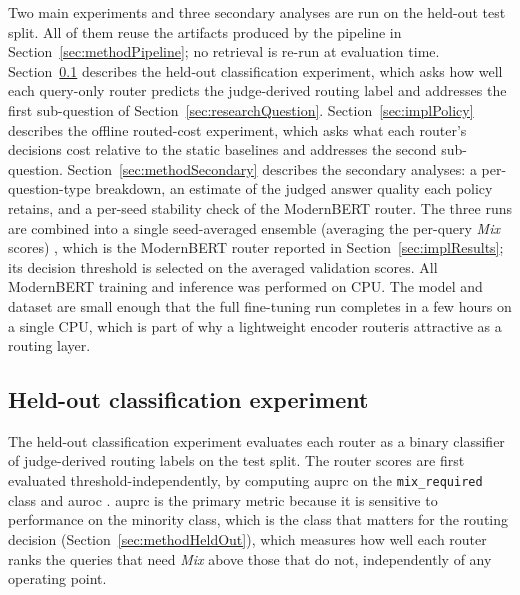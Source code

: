 \documentclass[english, bibtex]{kththesis}               %
\numberwithin{listing}{chapter}
\providecommand{\DIFaddtex}[1]{{\protect\color{blue} \sf #1}} %
\providecommand{\DIFdeltex}[1]{{\protect\color{red} \scriptsize #1}} %
\providecommand{\DIFaddbegin}{} %
\providecommand{\DIFaddend}{} %
\providecommand{\DIFdelbegin}{} %
\providecommand{\DIFdelend}{} %
\providecommand{\DIFadd}[1]{\texorpdfstring{\DIFaddtex{#1}}{#1}} %
\providecommand{\DIFdel}[1]{\texorpdfstring{\DIFdeltex{#1}}{}} %
\begin{document}
\DIFadd{Two main experiments and three secondary analyses are run on the held-out test split. All of them reuse the artifacts produced by the pipeline in Section~\ref{sec:methodPipeline}; no retrieval is re-run at evaluation time. Section~\ref{sec:implClassification} describes the held-out classification experiment, which asks how well each query-only router predicts the judge-derived routing label and addresses the first sub-question of Section~\ref{sec:researchQuestion}. Section~\ref{sec:implPolicy} describes the offline routed-cost experiment, which asks what each router's decisions cost relative to the static baselines and addresses the second sub-question. Section~\ref{sec:methodSecondary} describes the secondary analyses: a per-question-type breakdown, an estimate of the judged answer quality each policy retains, and a per-seed stability check of the ModernBERT router}\DIFaddend .
\DIFdelbegin \DIFdel{The three runs are combined into a single seed-averaged ensemble (averaging the per-query \emph{Mix} scores) , which is the ModernBERT router reported in Section~\ref{sec:implResults}; its decision threshold is selected on the averaged validation scores. All ModernBERT training and inference was performed on CPU. The model and dataset are small enough that the full fine-tuning run completes in a few hours on a single CPU, which is part of why a lightweight encoder routeris attractive as a routing layer.
}\DIFdelend 

\DIFdelbegin %
\DIFdelend \DIFaddbegin \subsection{Held-out classification experiment}
\DIFaddend \label{sec:implClassification}

The held-out classification experiment evaluates each router as a binary classifier of judge-derived routing labels on the test split. The router scores are first evaluated threshold-independently, by computing \gls{auprc} on the \texttt{mix\_required} class and \gls{auroc} \DIFdelbegin \DIFdel{. \Gls{auprc} is the primary metric because it is sensitive to performance on the minority class, which is the class that matters for the routing decision \cite{saito2015precision}}\DIFdelend \DIFaddbegin \DIFadd{(Section~\ref{sec:methodHeldOut}), which measures how well each router ranks the queries that need \emph{Mix} above those that do not, independently of any operating point}\DIFaddend .
\end{document}
